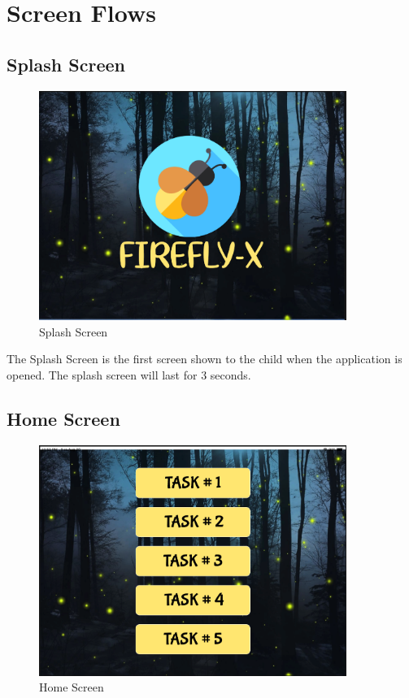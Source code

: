 \section{Screen Flows}


\subsection{Splash Screen}

\begin{figure}[H]
    \centering
    \includegraphics[width=10cm]{figures/newScreenFlows/newSplash.png}
    \caption{Splash Screen}
    \label{fig:splash}
\end{figure}

The Splash Screen is the first screen shown to the child when the application is opened. The splash screen will last for 3 seconds.

\subsection{Home Screen}

\begin{figure}[H]
    \centering
    \includegraphics[width=10cm]{figures/newScreenFlows/newMain.png}
    \caption{Home Screen}
    \label{fig:newhome}
\end{figure}

